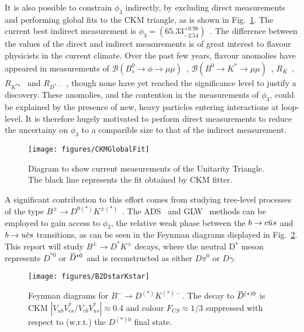 \documentclass[oneside,12pt]{article}
\newcommand{\overbar}[1]{\mkern 1.5mu\overline{\mkern-1.5mu#1\mkern-1.5mu}\mkern 1.5mu}
\begin{document}
It is also possible to constrain $\phi_3$ indirectly, by excluding direct measurements and performing global fits to the CKM triangle, as is shown in Fig.~\ref{fig:CKMGlobalFit}. The current best indirect measurement is $\phi_3=(65.33^{+0.96}_{-2.54})$\degree~\cite{website:CKMFitter}. The difference between the values of the direct and indirect measurements is of great interest to flavour physicists in the current climate. Over the past few years, flavour anomolies have appeared in
measurements of $\mathcal{B} (B^{0}_{s}\rightarrow \phi \rightarrow \mu \mu)$~\cite{B2phimumu}, $\mathcal{B} (B^{0}\rightarrow K^{*}\rightarrow \mu \mu)$~\cite{B2Kstmumu}, $R_{K}$~\cite{Rk}, $R_{K^{*0}}$~\cite{Rkst} and $R_{D^{*-}}$~\cite{RDst}, though none have yet reached the significance level to justify a discovery. These anomolies, and the contention in the measurements of $\phi_3$, could be explained by the presence of new, heavy particles entering interactions at loop-level. It is therefore hugely motivated to perform direct measurements to reduce the uncertainy on $\phi_{3}$ to a comparible size to that of the indirect
measurement.
\begin{figure}[H]
  \centering
  \texttt{[image: figures/CKMGlobalFit]}
  \caption{\small{Diagram to show current measurements of the Unitarity Triangle. The black line represents the fit obtained by CKM fitter.}}
  \label{fig:CKMGlobalFit}
  \vspace{-10pt}
\end{figure}
\noindent A significant contribution to this effort comes from studying tree-level processes of the type $B^{\pm}\rightarrow D^{0(*)}K^{\pm (*)}$~\cite{B2DKD2hh, DalitzRun1, DalitzRun2, B2DKstD2hh, B2DstKD2hh}. The ADS~\cite{ADSRef} and GLW~\cite{GLWRef} methods can be employed to gain access to $\phi_3$, the relative weak phase between the $b\rightarrow c\overbar{u}s$ and $b\rightarrow u\overbar{c}s$ transitions, as can be seen in the Feynman diagrams displayed in Fig.~\ref{fig:B2DstarKstar}. This report will study $B^{\pm}\rightarrow D^{*}K^{\pm}$ decays, where the neutral D$^{*}$ meson represents $D^{*0}$ or $\overbar{D}^{*0}$ and is reconstructed as either $D\pi^{0}$ or $D\gamma$. 
\begin{figure}[H]
  \centering
  \texttt{[image: figures/B2DstarKstar]}
  \caption{\small{Feynman diagrams for ${B}^{-}\rightarrow{D}^{(*)}{K}^{(*)-}$}. The decay to $\overbar{{D}}^{(*)0}$ is CKM $|V_{ub}V^{*}_{cs}/V_{cb}V^{*}_{us}|\approx0.4$ and colour ${F}_{CS}\approx1/3$ suppressed with respect to (w.r.t.) the ${D}^{(*)0}$ final state.}
  \label{fig:B2DstarKstar}
  \vspace{-10pt}
\end{figure}
\end{document}
